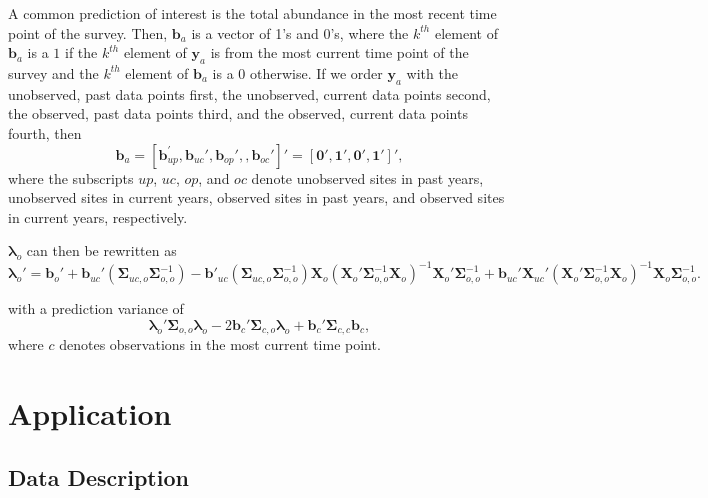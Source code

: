 \documentclass[]{interact}
\theoremstyle{plain}%
\theoremstyle{definition}
\theoremstyle{remark}
\begin{document}
A common prediction of interest is the total abundance in the most
recent time point of the survey. Then, \(\mathbf{b}_a\) is a vector of
1's and 0's, where the \(k^{th}\) element of \(\mathbf{b}_a\) is a \(1\)
if the \(k^{th}\) element of \(\mathbf{y}_a\) is from the most current
time point of the survey and the \(k^{th}\) element of \(\mathbf{b}_a\)
is a 0 otherwise. If we order \(\mathbf{y}_a\) with the unobserved, past
data points first, the unobserved, current data points second, the
observed, past data points third, and the observed, current data points
fourth, then \mbox{} \begin{equation}
\mathbf{b}_a = [\mathbf{b}_{up}^\prime, \mathbf{b}_{uc}', \mathbf{b}_{op}', , \mathbf{b}_{oc}']' = [\mathbf{0}', \mathbf{1}', \mathbf{0}', \mathbf{1}']',
\end{equation} \noindent where the subscripts \(up\), \(uc\), \(op\),
and \(oc\) denote unobserved sites in past years, unobserved sites in
current years, observed sites in past years, and observed sites in
current years, respectively.

\(\bm{\lambda}_o\) can then be rewritten as \mbox{} \begin{equation}
\bm{\lambda}_o' = \mathbf{b}_{o}' + \mathbf{b}_{uc}' (\bm{\Sigma}_{uc, o}\bm{\Sigma}_{o, o}^{-1}) - \mathbf{b}'_{uc}(\bm{\Sigma}_{uc, o} \bm{\Sigma}_{o, o}^{-1})\mathbf{X}_o(\mathbf{X}_o'\bm{\Sigma}_{o, o}^{-1}\mathbf{X}_o)^{-1}\mathbf{X}_o'\bm{\Sigma}_{o, o}^{-1} + \mathbf{b}_{uc}' \mathbf{X}_{uc}'(\mathbf{X}_o'\bm{\Sigma}_{o, o}^{-1}\mathbf{X}_o)^{-1}\mathbf{X}_o \bm{\Sigma}_{o, o}^{-1}.
\end{equation}

with a prediction variance of \mbox{} \begin{equation}
\bm{\lambda}_o'\bm{\Sigma}_{o, o}\bm{\lambda}_o - 2 \mathbf{b}_{c}' \bm{\Sigma}_{c, o} \bm{\lambda}_o + \mathbf{b}_{c}' \bm{\Sigma}_{c, c} \mathbf{b}_{c},
\end{equation} \noindent where \(c\) denotes observations in the most
current time point.

\section{Application} \label{section:Application}

\subsection{Data Description}
\end{document}
